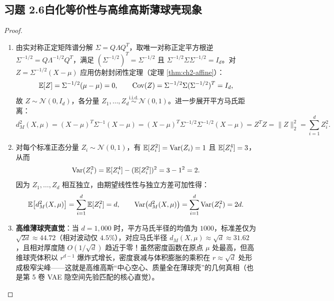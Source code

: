 \subsection*{习题 2.6\quad 白化等价性与高维高斯薄球壳现象}
\begin{proof}
\begin{enumerate}[label=(\arabic*), leftmargin=1.8em]
  \item 由实对称正定矩阵谱分解 $\Sigma = Q\Lambda Q^T$，取唯一对称正定平方根逆 $\Sigma^{-1/2} = Q\Lambda^{-1/2}Q^T$，满足 $(\Sigma^{-1/2})^T = \Sigma^{-1/2}$ 且 $\Sigma^{-1/2}\Sigma\Sigma^{-1/2} = I_d$。对 $Z = \Sigma^{-1/2}(X - \mu)$ 应用仿射封闭性定理（定理 \ref{thm:ch2-affine}）：
  \[
    \mathbb{E}[Z] = \Sigma^{-1/2}(\mu - \mu) = 0, \qquad
    \operatorname{Cov}(Z) = \Sigma^{-1/2}\Sigma (\Sigma^{-1/2})^T = I_d,
  \]
  故 $Z \sim \mathcal{N}(0, I_d)$，各分量 $Z_1, \dots, Z_d \stackrel{\text{i.i.d.}}{\sim} \mathcal{N}(0, 1)$。进一步展开平方马氏距离：
  \[
    d_M^2(X, \mu) = (X - \mu)^T \Sigma^{-1} (X - \mu)
    = (X - \mu)^T \Sigma^{-1/2}\Sigma^{-1/2} (X - \mu)
    = Z^T Z = \|Z\|_2^2 = \sum_{i=1}^d Z_i^2.
  \]
  \item 对每个标准正态分量 $Z_i \sim \mathcal{N}(0, 1)$，有 $\mathbb{E}[Z_i^2] = \operatorname{Var}(Z_i) = 1$ 且 $\mathbb{E}[Z_i^4] = 3$，从而
  \[
    \operatorname{Var}(Z_i^2) = \mathbb{E}[Z_i^4] - (\mathbb{E}[Z_i^2])^2 = 3 - 1^2 = 2.
  \]
  因为 $Z_1, \dots, Z_d$ 相互独立，由期望线性性与独立方差可加性得：
  \[
    \mathbb{E}\bigl[d_M^2(X, \mu)\bigr] = \sum_{i=1}^d \mathbb{E}[Z_i^2] = d, \qquad
    \operatorname{Var}\bigl(d_M^2(X, \mu)\bigr) = \sum_{i=1}^d \operatorname{Var}(Z_i^2) = 2d.
  \]
  \item \textbf{高维薄球壳直觉}：当 $d = 1{,}000$ 时，平方马氏半径的均值为 $1000$，标准差仅为 $\sqrt{2d} \approx 44.72$（相对波动仅 $4.5\%$），对应马氏半径 $d_M(X, \mu) \approx \sqrt{d} \approx 31.62$，且相对厚度随 $O(1/\sqrt{d})$ 趋近于零！虽然密度函数在原点 $\mu$ 处最高，但高维球壳体积以 $r^{d-1}$ 爆炸式增长，密度衰减与体积膨胀的乘积在 $r \approx \sqrt{d}$ 处形成极窄尖峰——这就是高维高斯“中心空心、质量全在薄球壳”的几何真相（也是第 5 卷 VAE 隐空间先验匹配的核心直觉）。
\end{enumerate}
\end{proof}

